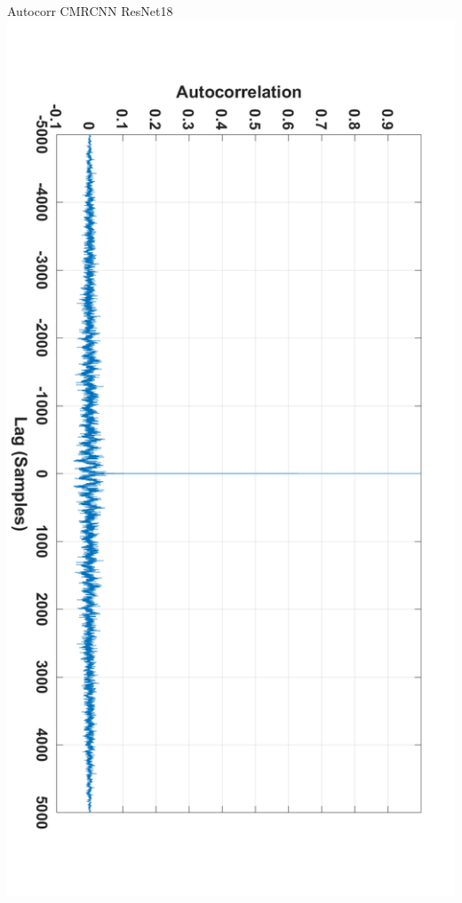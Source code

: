 \documentclass[18pt]{beamer}
\begin{document}
\begin{frame}{Autocorr CMRCNN ResNet18}
\includegraphics[width=\textwidth]{figures/graphs/autocorr_cmrcnn_resnet18.png}
\end{frame}
\end{document}
